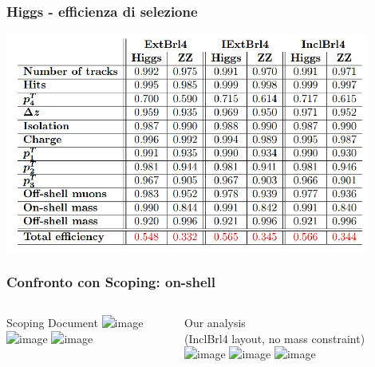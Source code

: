 \documentclass{beamer}
\begin{document}

\begin{frame}
\frametitle{Higgs - efficienza di selezione}
\centering
\includegraphics[width=0.9\textwidth]{HZZ4mu/eff_tab}
\end{frame}


\begin{frame}[t]
\frametitle{Confronto con Scoping: on-shell}

\begin{columns}
\begin{column}{.5\textwidth}
\centering
\vskip1.2cm
Scoping Document
\includegraphics<1>[width=\textwidth,height=4.5cm]{scopingSigOnShell27}
\includegraphics<2>[width=\textwidth,height=4.5cm]{scopingSigOnShell32}
\includegraphics<3>[width=\textwidth,height=4.5cm]{scopingSigOnShell4}
\end{column}
\begin{column}{.5\textwidth}
\centering
\vskip0.6cm
Our analysis \\(InclBrl4 layout, no mass constraint)
\vskip0.1cm
\includegraphics<1>[width=\textwidth]{HZZ4mu/recoOnShellMass27}
\includegraphics<2>[width=\textwidth]{HZZ4mu/recoOnShellMass32}
\includegraphics<3>[width=\textwidth]{HZZ4mu/recoOnShellMass4}
\end{column}

\end{columns}
\end{frame}

\end{document}
